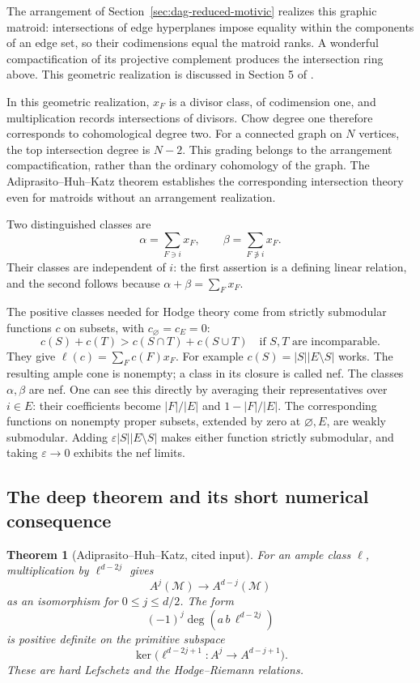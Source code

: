 \documentclass[11pt]{article}
\newtheorem{theorem}{Theorem}[section]
\theoremstyle{definition}
\theoremstyle{remark}
\begin{document}
The arrangement of Section~\ref{sec:dag-reduced-motivic} realizes this graphic matroid: intersections of edge hyperplanes impose equality within the components of an edge set, so their codimensions equal the matroid ranks. A wonderful compactification of its projective complement produces the intersection ring above. This geometric realization is discussed in Section 5 of \cite{gmhAHK2018}.

In this geometric realization, $x_F$ is a divisor class, of codimension one, and multiplication records intersections of divisors. Chow degree one therefore corresponds to cohomological degree two. For a connected graph on $N$ vertices, the top intersection degree is $N-2$. This grading belongs to the arrangement compactification, rather than the ordinary cohomology of the graph. The Adiprasito--Huh--Katz theorem establishes the corresponding intersection theory even for matroids without an arrangement realization.

Two distinguished classes are
\[
 \alpha=\sum_{F\ni i}x_F,
 \qquad \beta=\sum_{F\not\ni i}x_F.
\]
Their classes are independent of $i$: the first assertion is a defining linear relation, and the second follows because $\alpha+\beta=\sum_Fx_F$.

The positive classes needed for Hodge theory come from strictly submodular functions $c$ on subsets, with $c_\varnothing=c_E=0$:
\[
 c(S)+c(T)>c(S\cap T)+c(S\cup T)
 \quad\text{if }S,T\text{ are incomparable}.
\]
They give $\ell(c)=\sum_Fc(F)x_F$. For example $c(S)=|S||E\setminus S|$ works. The resulting ample cone is nonempty; a class in its closure is called nef. The classes $\alpha,\beta$ are nef. One can see this directly by averaging their representatives over $i\in E$: their coefficients become $|F|/|E|$ and $1-|F|/|E|$. The corresponding functions on nonempty proper subsets, extended by zero at $\varnothing,E$, are weakly submodular. Adding $\varepsilon|S||E\setminus S|$ makes either function strictly submodular, and taking $\varepsilon\to0$ exhibits the nef limits.

\subsection{The deep theorem and its short numerical consequence}

\begin{theorem}[Adiprasito--Huh--Katz, cited input]\label{thm:gmh-hodge}
For an ample class $\ell$, multiplication by $\ell^{d-2j}$ gives
\[
 A^j(\mathcal M)\longrightarrow A^{d-j}(\mathcal M)
\]
as an isomorphism for $0\le j\le d/2$. The form
\[
 (-1)^j\deg(a\,b\,\ell^{d-2j})
\]
is positive definite on the primitive subspace
\[
 \ker\bigl(\ell^{d-2j+1}:A^j\longrightarrow A^{d-j+1}\bigr).
\]
These are hard Lefschetz and the Hodge--Riemann relations.
\end{theorem}
\end{document}
